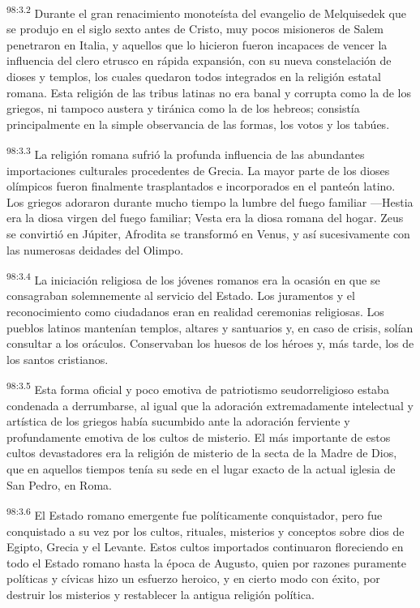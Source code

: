 \par
\textsuperscript{98:3.2} Durante el gran renacimiento monoteísta del evangelio de Melquisedek que se produjo en el siglo sexto antes de Cristo, muy pocos misioneros de Salem penetraron en Italia, y aquellos que lo hicieron fueron incapaces de vencer la influencia del clero etrusco en rápida expansión, con su nueva constelación de dioses y templos, los cuales quedaron todos integrados en la religión estatal romana. Esta religión de las tribus latinas no era banal y corrupta como la de los griegos, ni tampoco austera y tiránica como la de los hebreos; consistía principalmente en la simple observancia de las formas, los votos y los tabúes.

\par
\textsuperscript{98:3.3} La religión romana sufrió la profunda influencia de las abundantes importaciones culturales procedentes de Grecia. La mayor parte de los dioses olímpicos fueron finalmente trasplantados e incorporados en el panteón latino. Los griegos adoraron durante mucho tiempo la lumbre del fuego familiar ---Hestia era la diosa virgen del fuego familiar; Vesta era la diosa romana del hogar. Zeus se convirtió en Júpiter, Afrodita se transformó en Venus, y así sucesivamente con las numerosas deidades del Olimpo.

\par
\textsuperscript{98:3.4} La iniciación religiosa de los jóvenes romanos era la ocasión en que se consagraban solemnemente al servicio del Estado. Los juramentos y el reconocimiento como ciudadanos eran en realidad ceremonias religiosas. Los pueblos latinos mantenían templos, altares y santuarios y, en caso de crisis, solían consultar a los oráculos. Conservaban los huesos de los héroes y, más tarde, los de los santos cristianos.

\par
\textsuperscript{98:3.5} Esta forma oficial y poco emotiva de patriotismo seudorreligioso estaba condenada a derrumbarse, al igual que la adoración extremadamente intelectual y artística de los griegos había sucumbido ante la adoración ferviente y profundamente emotiva de los cultos de misterio. El más importante de estos cultos devastadores era la religión de misterio de la secta de la Madre de Dios, que en aquellos tiempos tenía su sede en el lugar exacto de la actual iglesia de San Pedro, en Roma.

\par
\textsuperscript{98:3.6} El Estado romano emergente fue políticamente conquistador, pero fue conquistado a su vez por los cultos, rituales, misterios y conceptos sobre dios de Egipto, Grecia y el Levante. Estos cultos importados continuaron floreciendo en todo el Estado romano hasta la época de Augusto, quien por razones puramente políticas y cívicas hizo un esfuerzo heroico, y en cierto modo con éxito, por destruir los misterios y restablecer la antigua religión política.

